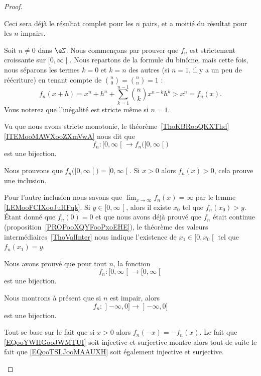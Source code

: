 \begin{proof}
\begin{subproof}
		Ceci sera déjà le résultat complet pour les \( n\) pairs, et a moitié du résultat pour les \( n\) impairs.
		\begin{subproof}
			Soit \( n\neq 0\) dans \( \eN\). Nous commençons par prouver que \( f_n\) est strictement croissante sur \( \mathopen[ 0 , \infty \mathclose[\). Nous repartons de la formule du binôme, mais cette fois, nous séparons les termes \( k=0\) et \( k=n\) des autres (si \( n=1\), il y a un peu de réécriture) en tenant compte de \( {n\choose 0}={n\choose n}=1\) :
			\begin{equation}
				f_n(x+h)=x^n+h^n+\sum_{k=1}^{n-1}{n\choose k}x^{n-k}h^k>x^n=f_n(x).
			\end{equation}
			Vous noterez que l'inégalité est stricte même si \( n=1\).

			Vu que nous avons stricte monotonie, le théorème~\ref{ThoKBRooQKXThd}\ref{ITEMooMAWXooZXmVwA} nous dit que
			\begin{equation}
				f_n\colon \mathopen[ 0 , \infty \mathclose[\to f_n\big( \mathopen[ 0 , \infty \mathclose[ \big)
			\end{equation}
			est une bijection.
			\spitem[Bijection]

			Nous prouvons que \( f_n\big( \mathopen[ 0 , \infty \mathclose[ \big)=\mathopen[ 0 , \infty \mathclose[\). Si \( x>0\) alors \( f_n(x)>0\), cela prouve une inclusion.

			Pour l'autre inclusion nous savons que \( \lim_{x\to \infty} f_n(x)=\infty\) par le lemme \ref{LEMooFCIXooJuHFqk}. Si \( y\in \mathopen[ 0 , \infty \mathclose[\), alors il existe \( x_0\) tel que \( f_n(x_0)>y\). Étant donné que \( f_n(0)=0\) et que nous avons déjà prouvé que \( f_n\) était continue (proposition~\ref{PROPooXQYFooPxoEHE}), le théorème des valeurs intermédiaires~\ref{ThoValInter} nous indique l'existence de \( x_1\in \mathopen[ 0 , x_0 \mathclose[\) tel que \( f_n(x_1)=y\).

		\end{subproof}

		Nous avons prouvé que pour tout \( n\), la fonction
		\begin{equation}        \label{EQooYWHGooJWMTUI}
			f_n\colon \mathopen[ 0 , \infty \mathclose[\to \mathopen[ 0 , \infty \mathclose[
		\end{equation}
		est une bijection.


		Nous montrons à présent que si \( n\) est impair, alors
		\begin{equation}        \label{EQooTSLJooMAAUXH}
			f_n\colon \mathopen] -\infty , 0 \mathclose]\to \mathopen] -\infty , 0 \mathclose]
		\end{equation}
		est une bijection.

		Tout se base sur le fait que si \( x>0\) alors \( f_n(-x)=-f_n(x)\). Le fait que \eqref{EQooYWHGooJWMTUI} soit injective et surjective montre alors tout de suite le fait que \eqref{EQooTSLJooMAAUXH} soit également injective et surjective.
	\end{subproof}
\end{proof}

